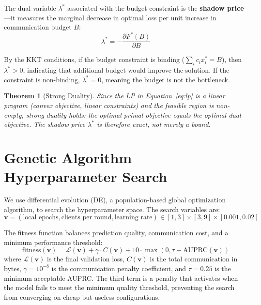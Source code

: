 \documentclass[11pt,a4paper]{report}
\newtheorem{theorem}{Theorem}[chapter]
\begin{document}
The dual variable $\lambda^*$ associated with the budget constraint is the \textbf{shadow price}---it measures the marginal decrease in optimal loss per unit increase in communication budget $B$:
\begin{equation}
\lambda^* = -\frac{\partial F^*(B)}{\partial B}
\label{eq:shadow}
\end{equation}

By the KKT conditions, if the budget constraint is binding ($\sum_i c_i x_i^* = B$), then $\lambda^* > 0$, indicating that additional budget would improve the solution. If the constraint is non-binding, $\lambda^* = 0$, meaning the budget is not the bottleneck.

\begin{theorem}[Strong Duality]
Since the LP in Equation~\ref{eq:lp} is a linear program (convex objective, linear constraints) and the feasible region is non-empty, strong duality holds: the optimal primal objective equals the optimal dual objective. The shadow price $\lambda^*$ is therefore exact, not merely a bound.
\end{theorem}

\section{Genetic Algorithm Hyperparameter Search}

We use differential evolution (DE), a population-based global optimization algorithm, to search the hyperparameter space. The search variables are:
\begin{equation}
\mathbf{v} = (\text{local\_epochs}, \text{clients\_per\_round}, \text{learning\_rate}) \in [1, 3] \times [3, 9] \times [0.001, 0.02]
\end{equation}

The fitness function balances prediction quality, communication cost, and a minimum performance threshold:
\begin{equation}
\text{fitness}(\mathbf{v}) = \mathcal{L}(\mathbf{v}) + \gamma \cdot C(\mathbf{v}) + 10 \cdot \max(0, \tau - \text{AUPRC}(\mathbf{v}))
\label{eq:fitness}
\end{equation}
where $\mathcal{L}(\mathbf{v})$ is the final validation loss, $C(\mathbf{v})$ is the total communication in bytes, $\gamma = 10^{-8}$ is the communication penalty coefficient, and $\tau = 0.25$ is the minimum acceptable AUPRC. The third term is a penalty that activates when the model fails to meet the minimum quality threshold, preventing the search from converging on cheap but useless configurations.
\end{document}
